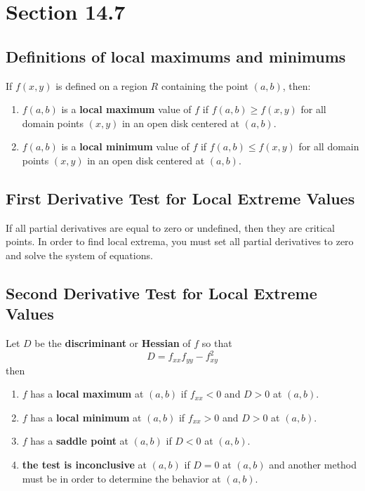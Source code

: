 \documentclass[../main.tex]{subfiles}
\begin{document}
\newpage
\section{Section 14.7}

\subsection{Definitions of local maximums and minimums}
If $f(x,y)$ is defined on a region $R$ containing the point $(a,b)$, then:
\begin{enumerate}
\item $f(a,b)$ is a \textbf{local maximum} value of $f$ if $f(a,b) \geq f(x,y)$ for all domain
	points $(x,y)$ in an open disk centered at $(a,b)$.
\item $f(a,b)$ is a \textbf{local minimum} value of $f$ if $f(a,b) \leq f(x,y)$ for all domain
	points $(x,y)$ in an open disk centered at $(a,b)$.
\end{enumerate}

\subsection{First Derivative Test for Local Extreme Values}
If all partial derivatives are equal to zero or undefined, then they are critical points.
In order to find local extrema, you must set all partial derivatives to zero and solve the system
of equations.

\subsection{Second Derivative Test for Local Extreme Values}
Let $D$ be the \textbf{discriminant} or \textbf{Hessian} of $f$ so that
\begin{equation*}
D = f_{xx}f_{yy} - f_{xy}^2
\end{equation*}
then 
\begin{enumerate}
\item $f$ has a \textbf{local maximum} at $(a,b)$ if $f_{xx} < 0$ and $D > 0$ at $(a,b)$.
\item $f$ has a \textbf{local minimum} at $(a,b)$ if $f_{xx} > 0$ and $D > 0$ at $(a,b)$.
\item $f$ has a \textbf{saddle point} at $(a,b)$ if $D < 0$ at $(a,b)$.
\item \textbf{the test is inconclusive} at $(a,b)$ if $D = 0$ at $(a,b)$ and another method must be
	in order to determine the behavior at $(a,b)$.
\end{enumerate}
\end{document}
